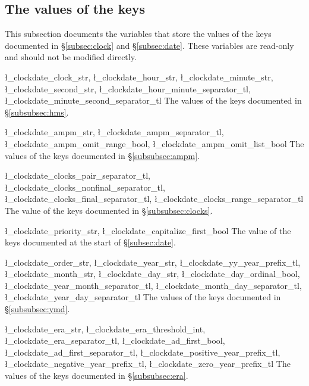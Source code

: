 \documentclass{beerydoc}
\begin{document}
\subsection{The values of the keys}
\label{subsec:varkeys}

This subsection documents the variables that store the values of the
 keys documented in \S\ref{subsec:clock} and
\S\ref{subsec:date}.
These variables are read-only and should not be modified directly.

\begin{codedoc}
  {
    \l_clockdate_clock_str,
    \l_clockdate_hour_str,
    \l_clockdate_minute_str,
    \l_clockdate_second_str,
    \l_clockdate_hour_minute_separator_tl,
    \l_clockdate_minute_second_separator_tl
  }
  The values of the keys documented in \S\ref{subsubsec:hms}.
\end{codedoc}

\begin{codedoc}
  {
    \l_clockdate_ampm_str,
    \l_clockdate_ampm_separator_tl,
    \l_clockdate_ampm_omit_range_bool,
    \l_clockdate_ampm_omit_list_bool
  }
  The values of the keys documented in \S\ref{subsubsec:ampm}.
\end{codedoc}

\begin{codedoc}
  {
    \l_clockdate_clocks_pair_separator_tl,
    \l_clockdate_clocks_nonfinal_separator_tl,
    \l_clockdate_clocks_final_separator_tl,
    \l_clockdate_clocks_range_separator_tl
  }
  The value of the keys documented in \S\ref{subsubsec:clocks}.
\end{codedoc}

\begin{codedoc}{\l_clockdate_priority_str, \l_clockdate_capitalize_first_bool}
  The value of the keys documented at the start of \S\ref{subsec:date}.
\end{codedoc}

\begin{codedoc}
  {
    \l_clockdate_order_str,
    \l_clockdate_year_str,
    \l_clockdate_yy_year_prefix_tl,
    \l_clockdate_month_str,
    \l_clockdate_day_str,
    \l_clockdate_day_ordinal_bool,
    \l_clockdate_year_month_separator_tl,
    \l_clockdate_month_day_separator_tl,
    \l_clockdate_year_day_separator_tl
  }
  The values of the keys documented in \S\ref{subsubsec:ymd}.
\end{codedoc}

\begin{codedoc}
  {
    \l_clockdate_era_str,
    \l_clockdate_era_threshold_int,
    \l_clockdate_era_separator_tl,
    \l_clockdate_ad_first_bool,
    \l_clockdate_ad_first_separator_tl,
    \l_clockdate_positive_year_prefix_tl,
    \l_clockdate_negative_year_prefix_tl,
    \l_clockdate_zero_year_prefix_tl
  }
  The values of the keys documented in \S\ref{subsubsec:era}.
\end{codedoc}
\end{document}
